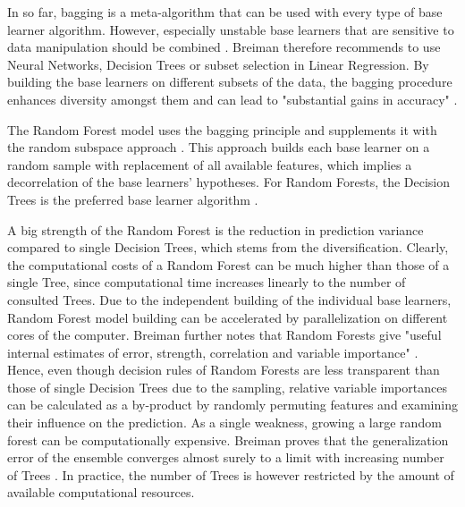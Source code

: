 \documentclass[12pt]{article}
\begin{document}
In so far, bagging is a meta-algorithm that can be used with every type of base learner algorithm. However, especially unstable base learners that are sensitive to data manipulation should be combined \citep[p.124]{breiman1996bagging}. Breiman therefore recommends to use Neural Networks, Decision Trees	or subset selection in Linear Regression. By building the base learners on different subsets of the data, the bagging procedure enhances diversity amongst them and can lead to "substantial gains in accuracy" \citep[p.123]{breiman1996bagging}.

The Random Forest model uses the bagging principle and supplements it with the random subspace approach \citep{ho1998random, breiman2001random}. This approach builds each base learner on a random sample with replacement of all available features, which implies a decorrelation of the base learners' hypotheses. For Random Forests, the Decision Trees is the preferred base learner algorithm \citep[cp.][]{breiman2001random}.

A big strength of the Random Forest is the reduction in prediction variance compared to single Decision Trees, which stems from the diversification. Clearly, the computational costs of a Random Forest can be much higher than those of a single Tree, since computational time increases linearly to the number of consulted Trees. Due to the independent building of the individual base learners, Random Forest model building can be accelerated by parallelization on different cores of the computer. Breiman further notes that Random Forests give "useful internal estimates of error, strength, correlation and variable importance" \citep[p.10]{breiman2001random}. Hence, even though decision rules of Random Forests are less transparent than those of single Decision Trees due to the sampling, relative variable importances can be calculated as a by-product by randomly permuting features and examining their influence on the prediction. As a single weakness, growing a large random forest can be computationally expensive. Breiman proves that the generalization error of the ensemble converges almost surely to a limit with increasing number of Trees \citep[p.30]{breiman2001random}. In practice, the number of Trees is however restricted by the amount of available computational resources.

\end{document}
